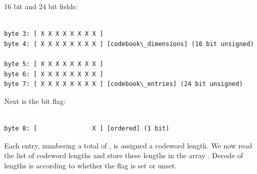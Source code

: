 16 bit  and 24 bit  fields:

\begin{Verbatim}[commandchars=\\\{\}]

byte 3: [ X X X X X X X X ]
byte 4: [ X X X X X X X X ] [codebook\_dimensions] (16 bit unsigned)

byte 5: [ X X X X X X X X ]
byte 6: [ X X X X X X X X ]
byte 7: [ X X X X X X X X ] [codebook\_entries] (24 bit unsigned)

\end{Verbatim}

Next is the \varname{[ordered]} bit flag:

\begin{Verbatim}[commandchars=\\\{\}]

byte 8: [               X ] [ordered] (1 bit)

\end{Verbatim}

Each entry, numbering a
total of , is assigned a codeword length.
We now read the list of codeword lengths and store these lengths in
the array . Decode of lengths is
according to whether the \varname{[ordered]} flag is set or unset.

